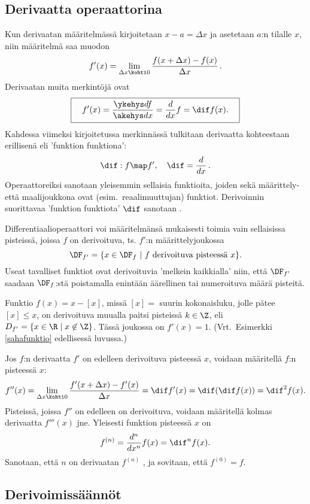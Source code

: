 \subsection{Derivaatta operaattorina}

Kun derivaatan määritelmässä kirjoitetaan $x-a=\Delta x$ ja asetetaan $a$:n tilalle $x$, niin
määritelmä saa muodon
\[
f'(x) = \lim_{\Delta x\kohti 0} \frac{f(x+\Delta x)-f(x)}{\Delta x}\,.
\]
Derivaatan muita merkintöjä ovat
\[
\boxed{\quad f'(x)=\frac{\ykehys df}{\akehys dx}=\frac{d}{dx}f=\dif f(x). \quad}
\]
Kahdessa viimeksi kirjoitetussa merkinnässä tulkitaan derivaatta kohteestaan erillisenä
 eli 'funktion funktiona':
\[
\dif:f \map f', \quad \dif = \frac{d}{dx}\,.
\]
Operaattoreiksi sanotaan yleisemmin sellaisia funktioita, joiden sekä määrittely- että 
maalijoukkona ovat (esim.\ reaalimuuttujan) funktiot. Derivoinnin suorittavaa
'funktion funktiota' $\dif$ sanotaan
%
.

Differentiaalioperaattori voi määritelmänsä mukaisesti toimia vain sellaisissa pisteissä,
joissa $f$ on derivoituva, ts. $f'$:n määrittelyjoukossa
\[
\DF_{f'}=\{x\in\DF_f \ | \ f \text{ derivoituva pisteessä } x\}.
\]
Useat tavalliset funktiot ovat derivoituvia 'melkein kaikkialla' niin, että $\DF_{f'}$
saadaan $\DF_f$:stä poistamalla enintään äärellinen tai numeroituva määrä pisteitä. 
\begin{Exa} Funktio $f(x)=x-[x]$, missä $[x]=$ suurin kokonaisluku, jolle pätee $[x] \le x$,
on derivoituva muualla paitsi pisteissä $k \in \Z$, eli $D_{f'}=\{x\in\R \mid x\not\in\Z\}$. 
Tässä joukossa on $f'(x)=1$. (Vrt.\ Esimerkki \ref{sahafunktio} edellisessä luvussa.) \loppu
\end{Exa}

Jos $f$:n derivaatta $f'$ on edelleen derivoituva pisteessä $x$, voidaan määritellä $f$:n 
 pisteessä $x$:
\[
f''(x)=\lim_{\Delta x\kohti 0} \frac{f'(x+\Delta x)-f'(x)}{\Delta x} = \dif f'(x)
      = \dif(\dif f(x)) = \dif^2 f(x).
\]
Pisteissä, joissa $f''$ on edelleen on derivoituva, voidaan määritellä kolmas derivaatta
$f'''(x)$ jne. Yleisesti funktion  pisteessä $x$ on
\[
f^{(n)}=\frac{d^n}{dx^n}f(x)=\dif^n f(x).
\]
%
Sanotaan, että $n$ on derivaatan $f^{(n)}$ , ja sovitaan, että $f^{(0)}=f$.

\subsection{Derivoimissäännöt}

